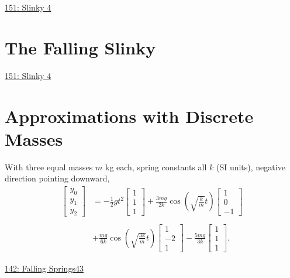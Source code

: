 \documentclass{ximera}
\begin{document}
\href{https://www.desmos.com/calculator/o1ny9elbie}{151: Slinky 4}


\section{The Falling Slinky}

\begin{onlineOnly}
    \begin{center}
\end{center}
\end{onlineOnly}

\href{https://www.desmos.com/calculator/o1ny9elbie}{151: Slinky 4}


\section{Approximations with Discrete Masses}

With three equal masses $m$ kg each, spring constants all $k$ (SI units), negative direction pointing downward,
\begin{align*}
 \begin{bmatrix}
y_0\\
y_1 \\
y_2
\end{bmatrix} 
&=
-\frac{1}{2}gt^2 
 \begin{bmatrix}
1\\
1 \\
1
\end{bmatrix} 
+
\frac{3mg}{2k} \cos\left( \sqrt{\frac{k}{m}} t  \right)
 \begin{bmatrix}
1\\
0 \\
-1
\end{bmatrix}   \\ \\
& +  
\frac{mg}{6k} \cos\left( \sqrt{\frac{3k}{m}} t  \right)
 \begin{bmatrix}
1\\
-2 \\
1
\end{bmatrix}
-  
\frac{5mg}{3k}
 \begin{bmatrix}
1\\
1 \\
1
\end{bmatrix}.
\end{align*}

\begin{onlineOnly}
    \begin{center}
\end{center}
\end{onlineOnly}

\href{https://www.desmos.com/calculator/tnhnhzfnbu}{142: Falling Springs43}
\end{document}
